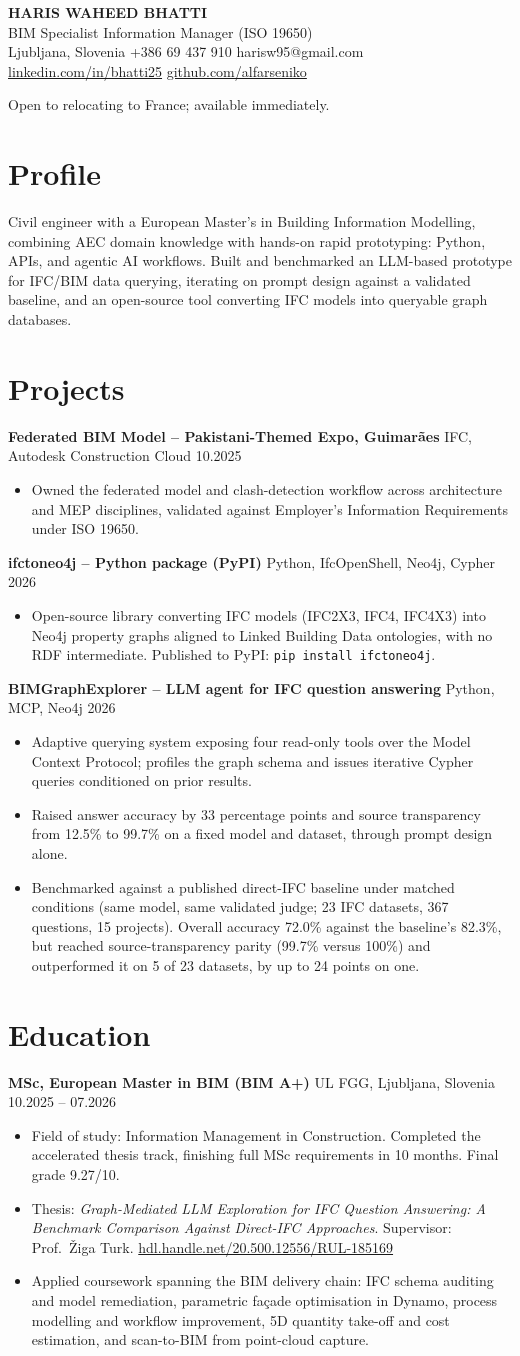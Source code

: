\documentclass[a4paper,10.5pt]{article}
\newcommand{\datefill}{\dotfill}
\newcommand{\entry}[3]{\vspace{2.5pt}\noindent\textbf{#1} \textbar{} #2 \datefill{} #3\par\vspace{0.5pt}}
\newcommand{\ROLELINE}{BIM Specialist \textbar{} Information Manager (ISO 19650)}
\newcommand{\projIfcToNeo}{%
\entry{ifctoneo4j -- Python package (PyPI)}{Python, IfcOpenShell, Neo4j, Cypher}{2026}
\begin{itemize}
  \item Open-source library converting IFC models (IFC2X3, IFC4, IFC4X3) into Neo4j
        property graphs aligned to Linked Building Data ontologies, with no RDF
        intermediate. Published to PyPI: \texttt{pip install ifctoneo4j}.
\end{itemize}}
\newcommand{\projBIMGraph}{%
\entry{BIMGraphExplorer -- LLM agent for IFC question answering}{Python, MCP, Neo4j}{2026}
\begin{itemize}
  \item Adaptive querying system exposing four read-only tools over the Model
        Context Protocol; profiles the graph schema and issues iterative Cypher
        queries conditioned on prior results.
  \item Raised answer accuracy by 33 percentage points and source transparency from
        12.5\% to 99.7\% on a fixed model and dataset, through prompt design alone.
  \item Benchmarked against a published direct-IFC baseline under matched
        conditions (same model, same validated judge; 23 IFC datasets, 367
        questions, 15 projects). Overall accuracy 72.0\% against the baseline's
        82.3\%, but reached source-transparency parity (99.7\% versus 100\%) and
        outperformed it on 5 of 23 datasets, by up to 24 points on one.
\end{itemize}}
\newcommand{\projGuimaraes}{%
\entry{Federated BIM Model -- Pakistani-Themed Expo, Guimar\~aes}{IFC, Autodesk Construction Cloud}{10.2025}
\begin{itemize}
  \item Owned the federated model and clash-detection workflow across architecture
        and MEP disciplines, validated against Employer's Information Requirements
        under ISO 19650.
\end{itemize}}
\begin{document}
\begin{center}
  {\LARGE\bfseries HARIS WAHEED BHATTI}\\[2pt]
  {\large \ROLELINE}\\[3pt]
  Ljubljana, Slovenia \textbar{} +386 69 437 910 \textbar{} harisw95@gmail.com\\
  \href{https://linkedin.com/in/bhatti25}{linkedin.com/in/bhatti25} \textbar{}
  \href{https://github.com/alfarseniko}{github.com/alfarseniko}
\end{center}
\vspace{-4pt}
\noindent\small Open to relocating to France; available immediately.\normalsize

\section{Profile}

\noindent Civil engineer with a European Master's in Building Information Modelling,
combining AEC domain knowledge with hands-on rapid prototyping: Python, APIs, and
agentic AI workflows. Built and benchmarked an LLM-based prototype for IFC/BIM data
querying, iterating on prompt design against a validated baseline, and an
open-source tool converting IFC models into queryable graph databases.

\section{Projects}

 \projGuimaraes \projIfcToNeo \projBIMGraph

\section{Education}
\entry{MSc, European Master in BIM (BIM A+)}{UL FGG, Ljubljana, Slovenia}{10.2025 -- 07.2026}
\begin{itemize}
  \item Field of study: Information Management in Construction. Completed the
        accelerated thesis track, finishing full MSc requirements in 10 months.
        Final grade 9.27/10.
  \item Thesis: \textit{Graph-Mediated LLM Exploration for IFC Question Answering:
        A Benchmark Comparison Against Direct-IFC Approaches}. Supervisor:
        Prof.~\v{Z}iga Turk. \href{http://hdl.handle.net/20.500.12556/RUL-185169}{hdl.handle.net/20.500.12556/RUL-185169}
  \item Applied coursework spanning the BIM delivery chain: IFC schema auditing and model remediation, parametric façade optimisation in Dynamo, process modelling and workflow improvement, 5D quantity take-off and cost estimation, and scan-to-BIM from point-cloud capture.
\end{itemize}
\end{document}
